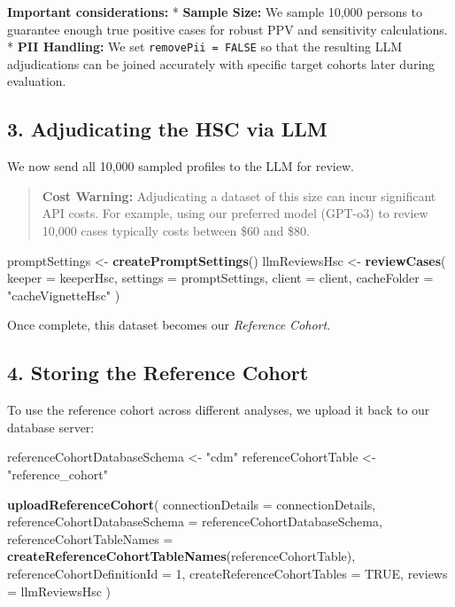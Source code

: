 \documentclass[
]{article}
\newenvironment{Shaded}{\begin{snugshade}}{\end{snugshade}}
\newcommand{\AttributeTok}[1]{\textcolor[rgb]{0.13,0.29,0.53}{#1}}
\newcommand{\ConstantTok}[1]{\textcolor[rgb]{0.56,0.35,0.01}{#1}}
\newcommand{\DecValTok}[1]{\textcolor[rgb]{0.00,0.00,0.81}{#1}}
\newcommand{\FunctionTok}[1]{\textcolor[rgb]{0.13,0.29,0.53}{\textbf{#1}}}
\newcommand{\NormalTok}[1]{#1}
\newcommand{\OtherTok}[1]{\textcolor[rgb]{0.56,0.35,0.01}{#1}}
\newcommand{\StringTok}[1]{\textcolor[rgb]{0.31,0.60,0.02}{#1}}
\begin{document}
\textbf{Important considerations:} * \textbf{Sample Size:} We sample
10,000 persons to guarantee enough true positive cases for robust PPV
and sensitivity calculations. * \textbf{PII Handling:} We set
\texttt{removePii\ =\ FALSE} so that the resulting LLM adjudications can
be joined accurately with specific target cohorts later during
evaluation.

\subsection{3. Adjudicating the HSC via
LLM}\label{adjudicating-the-hsc-via-llm}

We now send all 10,000 sampled profiles to the LLM for review.

\begin{quote}
\textbf{Cost Warning:} Adjudicating a dataset of this size can incur
significant API costs. For example, using our preferred model (GPT-o3)
to review 10,000 cases typically costs between \$60 and \$80.
\end{quote}

\begin{Shaded}
\begin{Highlighting}[]
\NormalTok{promptSettings }\OtherTok{\textless{}{-}} \FunctionTok{createPromptSettings}\NormalTok{()}
\NormalTok{llmReviewsHsc }\OtherTok{\textless{}{-}} \FunctionTok{reviewCases}\NormalTok{(}
  \AttributeTok{keeper =}\NormalTok{ keeperHsc,}
  \AttributeTok{settings =}\NormalTok{ promptSettings,}
  \AttributeTok{client =}\NormalTok{ client,}
  \AttributeTok{cacheFolder =} \StringTok{"cacheVignetteHsc"}
\NormalTok{)}
\end{Highlighting}
\end{Shaded}

Once complete, this dataset becomes our \emph{Reference Cohort}.

\subsection{4. Storing the Reference
Cohort}\label{storing-the-reference-cohort}

To use the reference cohort across different analyses, we upload it back
to our database server:

\begin{Shaded}
\begin{Highlighting}[]
\NormalTok{referenceCohortDatabaseSchema }\OtherTok{\textless{}{-}} \StringTok{"cdm"}
\NormalTok{referenceCohortTable }\OtherTok{\textless{}{-}} \StringTok{"reference\_cohort"}

\FunctionTok{uploadReferenceCohort}\NormalTok{(}
  \AttributeTok{connectionDetails =}\NormalTok{ connectionDetails,}
  \AttributeTok{referenceCohortDatabaseSchema =}\NormalTok{ referenceCohortDatabaseSchema,}
  \AttributeTok{referenceCohortTableNames =} \FunctionTok{createReferenceCohortTableNames}\NormalTok{(referenceCohortTable),}
  \AttributeTok{referenceCohortDefinitionId =} \DecValTok{1}\NormalTok{,}
  \AttributeTok{createReferenceCohortTables =} \ConstantTok{TRUE}\NormalTok{,}
  \AttributeTok{reviews =}\NormalTok{ llmReviewsHsc}
\NormalTok{)}
\end{Highlighting}
\end{Shaded}
\end{document}
